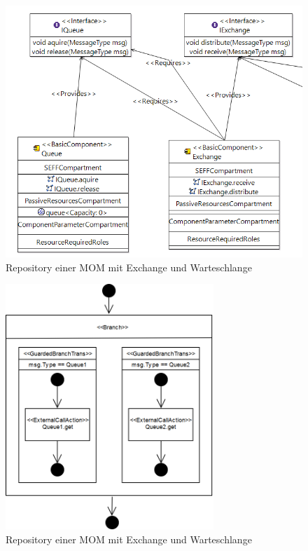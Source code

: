 \begin{figure}
\center
  \includegraphics[width=1\textwidth]{images/mom_repository.png}
  \caption{Repository einer MOM mit Exchange und Warteschlange}
  \label{img:mom_repository}
\end{figure}

\begin{figure}
\center
  \includegraphics[width=0.7\textwidth]{images/modelling/branchSeff.png}
  \caption{Repository einer MOM mit Exchange und Warteschlange}
  \label{img:queueBranch}
\end{figure}

